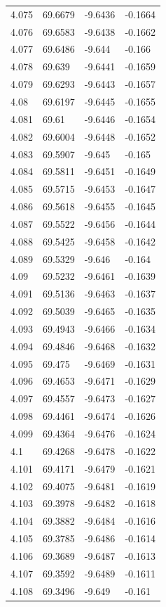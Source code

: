 \begin{tabular}{llll}
4.075 & 69.6679 & -9.6436 & -0.1664 \\
4.076 & 69.6583 & -9.6438 & -0.1662 \\
4.077 & 69.6486 & -9.644 & -0.166 \\
4.078 & 69.639 & -9.6441 & -0.1659 \\
4.079 & 69.6293 & -9.6443 & -0.1657 \\
4.08 & 69.6197 & -9.6445 & -0.1655 \\
4.081 & 69.61 & -9.6446 & -0.1654 \\
4.082 & 69.6004 & -9.6448 & -0.1652 \\
4.083 & 69.5907 & -9.645 & -0.165 \\
4.084 & 69.5811 & -9.6451 & -0.1649 \\
4.085 & 69.5715 & -9.6453 & -0.1647 \\
4.086 & 69.5618 & -9.6455 & -0.1645 \\
4.087 & 69.5522 & -9.6456 & -0.1644 \\
4.088 & 69.5425 & -9.6458 & -0.1642 \\
4.089 & 69.5329 & -9.646 & -0.164 \\
4.09 & 69.5232 & -9.6461 & -0.1639 \\
4.091 & 69.5136 & -9.6463 & -0.1637 \\
4.092 & 69.5039 & -9.6465 & -0.1635 \\
4.093 & 69.4943 & -9.6466 & -0.1634 \\
4.094 & 69.4846 & -9.6468 & -0.1632 \\
4.095 & 69.475 & -9.6469 & -0.1631 \\
4.096 & 69.4653 & -9.6471 & -0.1629 \\
4.097 & 69.4557 & -9.6473 & -0.1627 \\
4.098 & 69.4461 & -9.6474 & -0.1626 \\
4.099 & 69.4364 & -9.6476 & -0.1624 \\
4.1 & 69.4268 & -9.6478 & -0.1622 \\
4.101 & 69.4171 & -9.6479 & -0.1621 \\
4.102 & 69.4075 & -9.6481 & -0.1619 \\
4.103 & 69.3978 & -9.6482 & -0.1618 \\
4.104 & 69.3882 & -9.6484 & -0.1616 \\
4.105 & 69.3785 & -9.6486 & -0.1614 \\
4.106 & 69.3689 & -9.6487 & -0.1613 \\
4.107 & 69.3592 & -9.6489 & -0.1611 \\
4.108 & 69.3496 & -9.649 & -0.161 \\

\end{tabular}
